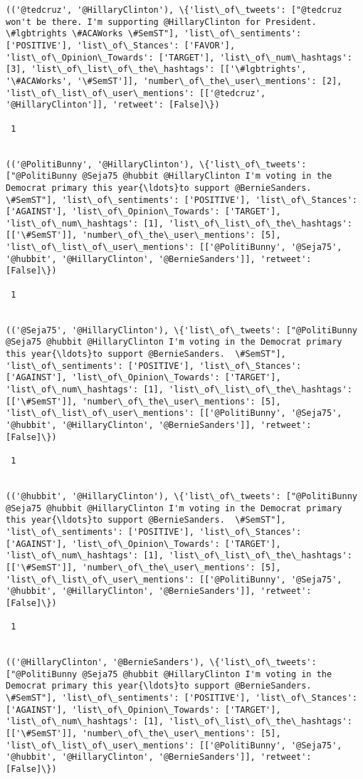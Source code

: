 \documentclass[11pt]{article}
\begin{document}
\begin{Verbatim}[commandchars=\\\{\}]
(('@tedcruz', '@HillaryClinton'), \{'list\_of\_tweets': ["@tedcruz won't be there. I'm supporting @HillaryClinton for President. \#lgbtrights \#ACAWorks \#SemST"], 'list\_of\_sentiments': ['POSITIVE'], 'list\_of\_Stances': ['FAVOR'], 'list\_of\_Opinion\_Towards': ['TARGET'], 'list\_of\_num\_hashtags': [3], 'list\_of\_list\_of\_the\_hashtags': [['\#lgbtrights', '\#ACAWorks', '\#SemST']], 'number\_of\_the\_user\_mentions': [2], 'list\_of\_list\_of\_user\_mentions': [['@tedcruz', '@HillaryClinton']], 'retweet': [False]\})

 1
 

(('@PolitiBunny', '@HillaryClinton'), \{'list\_of\_tweets': ["@PolitiBunny @Seja75 @hubbit @HillaryClinton I'm voting in the Democrat primary this year{\ldots}to support @BernieSanders.  \#SemST"], 'list\_of\_sentiments': ['POSITIVE'], 'list\_of\_Stances': ['AGAINST'], 'list\_of\_Opinion\_Towards': ['TARGET'], 'list\_of\_num\_hashtags': [1], 'list\_of\_list\_of\_the\_hashtags': [['\#SemST']], 'number\_of\_the\_user\_mentions': [5], 'list\_of\_list\_of\_user\_mentions': [['@PolitiBunny', '@Seja75', '@hubbit', '@HillaryClinton', '@BernieSanders']], 'retweet': [False]\})

 1
 

(('@Seja75', '@HillaryClinton'), \{'list\_of\_tweets': ["@PolitiBunny @Seja75 @hubbit @HillaryClinton I'm voting in the Democrat primary this year{\ldots}to support @BernieSanders.  \#SemST"], 'list\_of\_sentiments': ['POSITIVE'], 'list\_of\_Stances': ['AGAINST'], 'list\_of\_Opinion\_Towards': ['TARGET'], 'list\_of\_num\_hashtags': [1], 'list\_of\_list\_of\_the\_hashtags': [['\#SemST']], 'number\_of\_the\_user\_mentions': [5], 'list\_of\_list\_of\_user\_mentions': [['@PolitiBunny', '@Seja75', '@hubbit', '@HillaryClinton', '@BernieSanders']], 'retweet': [False]\})

 1
 

(('@hubbit', '@HillaryClinton'), \{'list\_of\_tweets': ["@PolitiBunny @Seja75 @hubbit @HillaryClinton I'm voting in the Democrat primary this year{\ldots}to support @BernieSanders.  \#SemST"], 'list\_of\_sentiments': ['POSITIVE'], 'list\_of\_Stances': ['AGAINST'], 'list\_of\_Opinion\_Towards': ['TARGET'], 'list\_of\_num\_hashtags': [1], 'list\_of\_list\_of\_the\_hashtags': [['\#SemST']], 'number\_of\_the\_user\_mentions': [5], 'list\_of\_list\_of\_user\_mentions': [['@PolitiBunny', '@Seja75', '@hubbit', '@HillaryClinton', '@BernieSanders']], 'retweet': [False]\})

 1
 

(('@HillaryClinton', '@BernieSanders'), \{'list\_of\_tweets': ["@PolitiBunny @Seja75 @hubbit @HillaryClinton I'm voting in the Democrat primary this year{\ldots}to support @BernieSanders.  \#SemST"], 'list\_of\_sentiments': ['POSITIVE'], 'list\_of\_Stances': ['AGAINST'], 'list\_of\_Opinion\_Towards': ['TARGET'], 'list\_of\_num\_hashtags': [1], 'list\_of\_list\_of\_the\_hashtags': [['\#SemST']], 'number\_of\_the\_user\_mentions': [5], 'list\_of\_list\_of\_user\_mentions': [['@PolitiBunny', '@Seja75', '@hubbit', '@HillaryClinton', '@BernieSanders']], 'retweet': [False]\})


\end{Verbatim}
\end{document}
